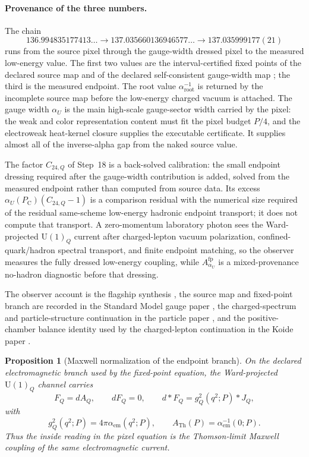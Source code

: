 \documentclass[11pt]{article}
\newtheorem{proposition}{Proposition}
\theoremstyle{remark}
\newcommand{\U}{\mathrm{U}}
\newcommand{\ATh}{A_{\mathrm{Th}}}
\newcommand{\Ppub}{P_{\mathrm C}}
\begin{document}
\paragraph*{Provenance of the three numbers.}
The chain
\[
136.994835177413\ldots
\longrightarrow
137.035660136946577\ldots
\longrightarrow
137.035999177(21)
\]
runs from the source pixel through the gauge-width dressed pixel to the
measured low-energy value. The first two values are the interval-certified
fixed points of the declared source map and of the declared self-consistent
gauge-width map \cite{oph-code}; the third is the measured endpoint. The
root value \(\alpha_{\mathrm{root}}^{-1}\) is returned by the incomplete
source map before the low-energy charged vacuum is attached. The gauge width
\(\alpha_U\) is the main high-scale gauge-sector width carried by the pixel:
the weak and color representation content must fit the pixel budget
\(P/4\), and the electroweak heat-kernel closure supplies the executable
certificate. It supplies almost all of the inverse-alpha gap from the naked
source value.

The factor \(C_{24,Q}\) of Step~18 is a back-solved calibration: the small
endpoint dressing required after the gauge-width contribution is added,
solved from the measured endpoint rather than computed from source data.
Its excess \(\alpha_U(\Ppub)(C_{24,Q}-1)\) is a comparison residual with the
numerical size required of the residual same-scheme low-energy hadronic
endpoint transport; it does not compute that transport. A zero-momentum
laboratory photon sees the Ward-projected \(\mathrm U(1)_Q\) current after
charged-lepton vacuum polarization, confined-quark/hadron spectral
transport, and finite endpoint matching, so the observer measures the fully
dressed low-energy coupling, while \(A_{\alpha_U}^{\mathrm{fp}}\) is a
mixed-provenance no-hadron diagnostic before that dressing.

The observer account is the flagship synthesis \cite{oph-synthesis}, the
source map and fixed-point branch are recorded in the Standard Model gauge
paper \cite{oph-smgr}, the charged-spectrum and particle-structure
continuation in the particle paper \cite{oph-particle}, and the
positive-chamber balance identity used by the charged-lepton continuation in
the Koide paper \cite{oph-koide}.

\begin{proposition}[Maxwell normalization of the endpoint branch]
On the declared electromagnetic branch used by the fixed-point equation, the Ward-projected
\(\U(1)_Q\) channel carries
\[
F_Q=dA_Q,\qquad dF_Q=0,\qquad d{*}F_Q=g_Q^2(q^2;P){*}J_Q,
\]
with
\[
g_Q^2(q^2;P)=4\pi\alpha_{\mathrm{em}}(q^2;P),
\qquad
\ATh(P)=\alpha_{\mathrm{em}}^{-1}(0;P).
\]
Thus the inside reading in the pixel equation is the Thomson-limit Maxwell coupling of the same
electromagnetic current.
\end{proposition}
\end{document}
